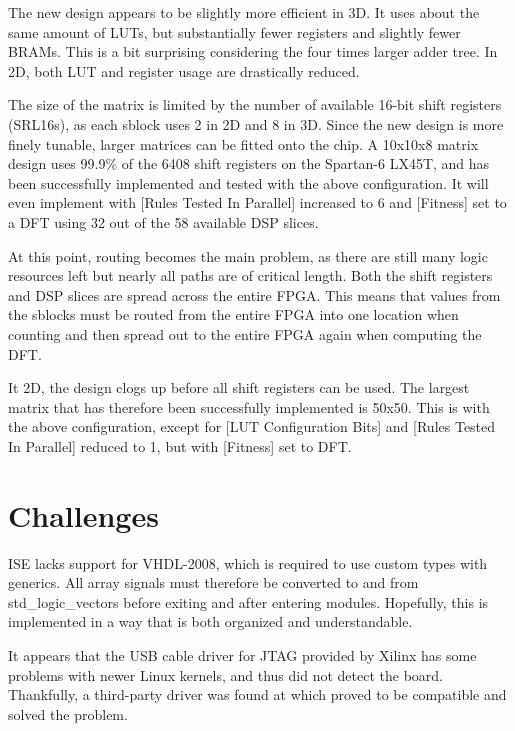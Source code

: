 The new design appears to be slightly more efficient in 3D.
It uses about the same amount of LUTs, but substantially fewer registers and slightly fewer BRAMs.
This is a bit surprising considering the four times larger adder tree.
In 2D, both LUT and register usage are drastically reduced.

The size of the matrix is limited by the number of available 16-bit shift registers (SRL16s), as each sblock uses 2 in 2D and 8 in 3D.
Since the new design is more finely tunable, larger matrices can be fitted onto the chip.
A 10x10x8 matrix design uses 99.9\% of the 6408 shift registers on the Spartan-6 LX45T, and has been successfully implemented and tested with the above configuration.
It will even implement with [Rules Tested In Parallel] increased to 6 and [Fitness] set to a DFT using 32 out of the 58 available DSP slices.

At this point, routing becomes the main problem, as there are still many logic resources left but nearly all paths are of critical length.
Both the shift registers and DSP slices are spread across the entire FPGA.
This means that values from the sblocks must be routed from the entire FPGA into one location when counting and then spread out to the entire FPGA again when computing the DFT.

It 2D, the design clogs up before all shift registers can be used.
The largest matrix that has therefore been successfully implemented is 50x50.
This is with the above configuration, except for [LUT Configuration Bits] and [Rules Tested In Parallel] reduced to 1, but with [Fitness] set to DFT.


\section{Challenges}
\label{sec:challenges}

ISE lacks support for VHDL-2008, which is required to use custom types with generics.
All array signals must therefore be converted to and from std\_logic\_vectors before exiting and after entering modules.
Hopefully, this is implemented in a way that is both organized and understandable.

It appears that the USB cable driver for JTAG provided by Xilinx has some problems with newer Linux kernels, and thus did not detect the board.
Thankfully, a third-party driver was found at \cite{usbdriver} which proved to be compatible and solved the problem.

